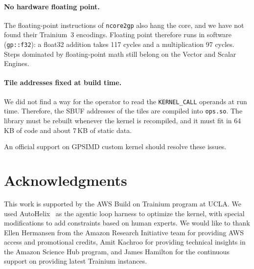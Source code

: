 \documentclass{article}
\newcommand{\code}[1]{\texttt{#1}}
\begin{document}
\paragraph{No hardware floating point.} The floating-point instructions of \code{ncore2gp} also hang the core, and we have not found their Trainium~3 encodings. Floating point therefore runs in software (\code{gp::f32}): a float32 addition takes 117 cycles and a multiplication 97 cycles. Steps dominated by floating-point math still belong on the Vector and Scalar Engines.

\paragraph{Tile addresses fixed at build time.} We did not find a way for the operator to read the \code{KERNEL\_CALL} operands at run time. Therefore, the SBUF addresses of the tiles are compiled into \code{ops.so}. The library must be rebuilt whenever the kernel is recompiled, and it must fit in 64\,KB of code and about 7\,KB of static data. 

An official support on GPSIMD custom kernel should resolve these issues.

\section*{Acknowledgments}

This work is supported by the AWS Build on Trainium program at UCLA. We used AutoHelix~\citep{autohelix} as the agentic loop harness to optimize the kernel, with special modifications to add constraints based on human experts. We would like to thank Ellen Hermansen from the Amazon Research Initiative team for providing AWS access and promotional credits, Amit Kachroo for providing technical insights in the Amazon Science Hub program, and James Hamilton for the continuous support on providing latest Trainium instances. 



\end{document}

